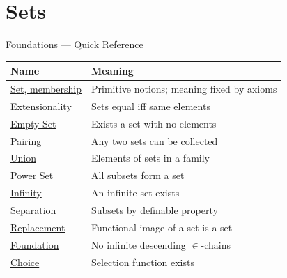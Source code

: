 \section{Sets}




\begin{toolkitbox}{Foundations --- Quick Reference}
\small
\begin{tabular}{l l}
\toprule
\textbf{Name}  & \textbf{Meaning} \\
\midrule
\hyperref[def:set-membership]{Set, membership}         & Primitive notions; meaning fixed by axioms \\
\hyperref[ax:extensionality]{Extensionality}          & Sets equal iff same elements \\
\hyperref[ax:empty-set]{Empty Set}               & Exists a set with no elements \\
\hyperref[ax:pairing]{Pairing}                 & Any two sets can be collected \\
\hyperref[ax:union]{Union}                   & Elements of sets in a family \\
\hyperref[ax:power-set]{Power Set}               & All subsets form a set \\
\hyperref[ax:infinity]{Infinity}                & An infinite set exists \\
\hyperref[ax:separation]{Separation}              & Subsets by definable property \\
\hyperref[ax:replacement]{Replacement}             & Functional image of a set is a set \\
\hyperref[ax:foundation]{Foundation}              & No infinite descending $\in$-chains \\
\hyperref[ax:choice]{Choice}                  & Selection function exists \\
\bottomrule
\end{tabular}
\end{toolkitbox}

